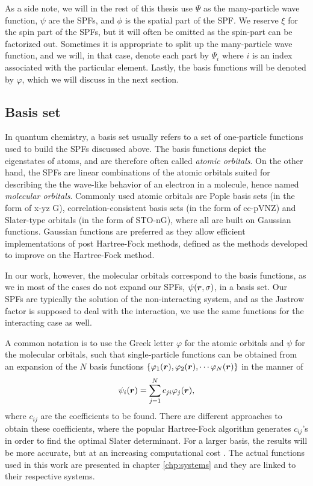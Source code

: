 As a side note, we will in the rest of this thesis use $\Psi$ as the many-particle wave function, $\psi$ are the SPFs, and $\phi$ is the spatial part of the SPF. We reserve $\xi$ for the spin part of the SPFs, but it will often be omitted as the spin-part can be factorized out. Sometimes it is appropriate to split up the many-particle wave function, and we will, in that case, denote each part by $\Psi_i$ where $i$ is an index associated with the particular element. Lastly, the basis functions will be denoted by $\varphi$, which we will discuss in the next section.

\subsection{Basis set} \label{sec:basisset}
In quantum chemistry, a basis set usually refers to a set of one-particle functions used to build the SPFs discussed above. The basis functions depict the eigenstates of atoms, and are therefore often called \textit{atomic orbitals}. On the other hand, the SPFs are linear combinations of the atomic orbitals suited for describing the the wave-like behavior of an electron in a molecule, hence named \textit{molecular orbitals}. Commonly used atomic orbitals are Pople basis sets \supercite{ditchfield_self-consistent_1971} (in the form of x-yz G), correlation-consistent basis sets \supercite{dunning_gaussian_1989} (in the form of cc-pVNZ) and Slater-type orbitals \supercite{slater_atomic_1930} (in the form of STO-nG), where all are built on Gaussian functions. Gaussian functions are preferred as they allow efficient implementations of post Hartree-Fock methods, defined as the methods developed to improve on the Hartree-Fock method.

In our work, however, the molecular orbitals correspond to the basis functions, as we in most of the cases do not expand our SPFs, $\psi(\boldsymbol{{r}},\sigma)$, in a basis set. Our SPFs are typically the solution of the non-interacting system, and as the Jastrow factor is supposed to deal with the interaction, we use the same functions for the interacting case as well.

A common notation is to use the Greek letter $\varphi$ for the atomic orbitals and $\psi$ for the molecular orbitals, such that single-particle functions can be obtained from an expansion of the $N$ basis functions $\{\varphi_1(\boldsymbol{{r}}),\varphi_2(\boldsymbol{{r}}),\cdots\varphi_N(\boldsymbol{{r}})\}$ in the manner of
\begin{equation}
\psi_i(\boldsymbol{{r}})=\sum_{j=1}^Nc_{ji}\varphi_j(\boldsymbol{{r}}),
\label{eq:expansion}
\end{equation}
where $c_{ij}$ are the coefficients to be found. There are different approaches to obtain these coefficients, where the popular Hartree-Fock algorithm generates $c_{ij}$'s in order to find the optimal Slater determinant. For a larger basis, the results will be more accurate, but at an increasing computational cost \supercite{daniel_crawford_introduction_2007}. The actual functions used in this work are presented in chapter \ref{chp:systems} and they are linked to their respective systems. 


